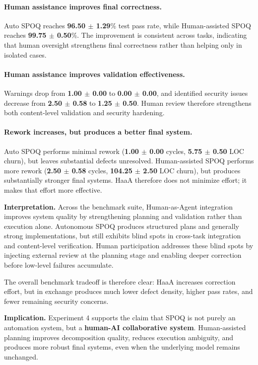 \paragraph{Human assistance improves final correctness.}
Auto SPOQ reaches \textbf{96.50 $\pm$ 1.29}\% test pass rate, while Human-assisted SPOQ reaches \textbf{99.75 $\pm$ 0.50}\%. The improvement is consistent across tasks, indicating that human oversight strengthens final correctness rather than helping only in isolated cases.

\paragraph{Human assistance improves validation effectiveness.}
Warnings drop from \textbf{1.00 $\pm$ 0.00} to \textbf{0.00 $\pm$ 0.00}, and identified security issues decrease from \textbf{2.50 $\pm$ 0.58} to \textbf{1.25 $\pm$ 0.50}. Human review therefore strengthens both content-level validation and security hardening.

\paragraph{Rework increases, but produces a better final system.}
Auto SPOQ performs minimal rework (\textbf{1.00 $\pm$ 0.00} cycles, \textbf{5.75 $\pm$ 0.50} LOC churn), but leaves substantial defects unresolved. Human-assisted SPOQ performs more rework (\textbf{2.50 $\pm$ 0.58} cycles, \textbf{104.25 $\pm$ 2.50} LOC churn), but produces substantially stronger final systems. HaaA therefore does not minimize effort; it makes that effort more effective.

\textbf{Interpretation.}
Across the benchmark suite, Human-as-Agent integration improves system quality by strengthening planning and validation rather than execution alone. Autonomous SPOQ produces structured plans and generally strong implementations, but still exhibits blind spots in cross-task integration and content-level verification. Human participation addresses these blind spots by injecting external review at the planning stage and enabling deeper correction before low-level failures accumulate.

The overall benchmark tradeoff is therefore clear: HaaA increases correction effort, but in exchange produces much lower defect density, higher pass rates, and fewer remaining security concerns.

\textbf{Implication.}
Experiment 4 supports the claim that SPOQ is not purely an automation system, but a \textbf{human-AI collaborative system}. Human-assisted planning improves decomposition quality, reduces execution ambiguity, and produces more robust final systems, even when the underlying model remains unchanged.

